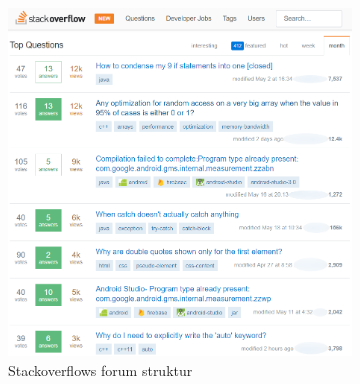 \begin{figure}[H]
    \begin{subfigure}{0.5\textwidth}
        \centering
        \includegraphics[width=1.0\linewidth ]{Projectdoc/Assets/Illustrationer/stackoverflow_forum_eksempel.png} 
        \caption{Stackoverflows forum struktur}
        \label{fig:stackoverflow_forum}
    \end{subfigure}
    \begin{subfigure}{0.5\textwidth}
        \centering

\end{subfigure}
\end{figure}
